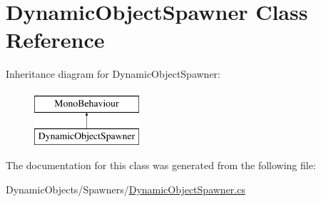 \hypertarget{class_dynamic_object_spawner}{}\section{Dynamic\+Object\+Spawner Class Reference}
\label{class_dynamic_object_spawner}
Inheritance diagram for Dynamic\+Object\+Spawner\+:\begin{figure}[H]
\begin{center}
\leavevmode
\includegraphics[height=2.000000cm]{class_dynamic_object_spawner}
\end{center}
\end{figure}


The documentation for this class was generated from the following file\+:\begin{DoxyCompactItemize}
\item 
Dynamic\+Objects/\+Spawners/\mbox{\hyperlink{_dynamic_object_spawner_8cs}{Dynamic\+Object\+Spawner.\+cs}}\end{DoxyCompactItemize}
